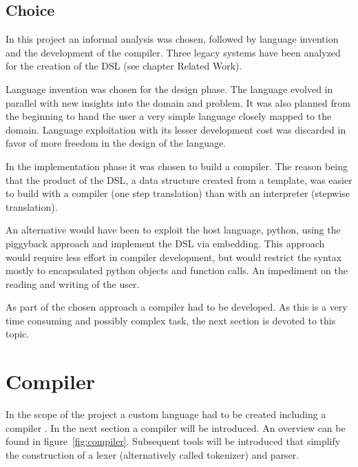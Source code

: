 \documentclass{scrartcl}
\begin{document}
\subsection{Choice}
\label{sub:conclusion}
In this project an informal analysis was chosen, followed by language invention
and the development of the compiler. Three legacy systems have been analyzed
for the creation of the DSL (see chapter Related Work).

Language invention was chosen for the design phase. The language evolved in
parallel with new insights into the domain and problem. It was also planned
from the beginning to hand the user a very simple language closely mapped to
the domain. Language exploitation with its lesser development cost was
discarded in favor of more freedom in the design of the language.

In the implementation phase it was chosen to build a compiler. The reason being
that the product of the DSL, a data structure created from a template, was
easier to build with a compiler (one step translation) than with an interpreter
(stepwise translation).

An alternative would have been to exploit the host language, python, using the
piggyback approach and implement the DSL via embedding. This approach would
require less effort in compiler development, but would restrict the syntax
mostly to encapsulated python objects and function calls. An impediment on the
reading and writing of the user.

As part of the chosen approach a compiler had to be developed. As this is a
very time consuming and possibly complex task, the next section is devoted to
this topic.

\section{Compiler}
\label{sec:python_compiler}
In the scope of the project a custom language had to be created including a
compiler \cite{parr2009language}. In the next section a compiler will be
introduced. An overview can be found in figure~\ref{fig:compiler}. Subsequent tools will be introduced that simplify the construction
of a lexer (alternatively called tokenizer) and parser.
\end{document}
